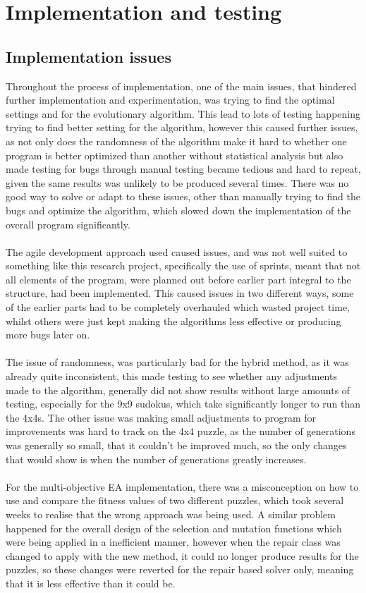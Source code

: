 \documentclass[a4paper,11pt]{article}
\begin{document}
\section{Implementation and testing}

\subsection{Implementation issues}
Throughout the process of implementation, one of the main issues, that hindered further implementation and experimentation, was trying to find the optimal settings and for the evolutionary algorithm. This lead to lots of testing happening trying to find better setting for the algorithm, however this caused further issues, as not only does the randomness of the algorithm make it hard to whether one program is better optimized than another without statistical analysis but also made testing for bugs through manual testing became tedious and hard to repeat, given the same results was unlikely to be produced several times. There was no good way to solve or adapt to these issues, other than manually trying to find the bugs and optimize the algorithm, which slowed down the implementation of the overall program significantly.\\\\ The agile development approach used caused issues, and was not well suited to something like this research project, specifically the use of sprints, meant that not all elements of the program, were planned out before earlier part integral to the structure, had been implemented. This caused issues in two different ways, some of the earlier parts had to be completely overhauled which wasted project time, whilst others were just kept making the algorithms less effective or producing more bugs later on. \\\\The issue of randomness, was particularly bad for the hybrid method, as it was already quite inconsistent, this made testing to see whether any adjustments made to the algorithm, generally did not show results without large amounts of testing, especially for the 9x9 sudokus, which take significantly longer to run than the 4x4s. The other issue was making small adjustments to program for improvements was hard to track on the 4x4 puzzle, as the number of generations was generally so small, that it couldn't be improved much, so the only changes that would show is when the number of generations greatly increases. \\\\For the multi-objective EA implementation, there was a misconception on how to use and compare the fitness values of two different puzzles, which took several weeks to realise that the wrong approach was being used. A similar problem happened for the overall design of the selection and mutation functions which were being applied in a inefficient manner, however when the repair class was changed to apply with the new method, it could no longer produce results for the puzzles, so these changes were reverted for the repair based solver only, meaning that it is less effective than it could be.\\\\
\end{document}
